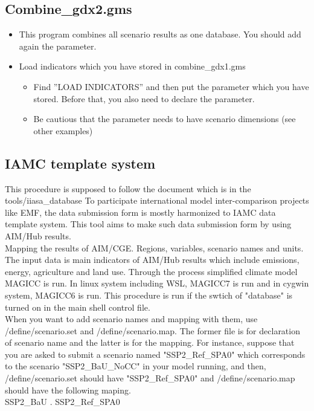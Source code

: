 \documentclass[10pt,a4paper,titlepage,dvipdfmx]{book}
\begin{document}
\subsection{\label{subsec:Combine2}Combine\_gdx2.gms}


\begin{itemize}
\item This program combines all scenario results as one database. You should add again the parameter.
\item Load indicators which you have stored in combine\_gdx1.gms
\begin{itemize}
\item Find ''LOAD INDICATORS'' and then put the parameter which you have stored. Before that, you also need to declare the parameter.
\item Be cautious that the parameter needs to have scenario dimensions (see other examples)
\end{itemize}

\end{itemize}
\subsection{\label{subsec:IAMCTemSts}IAMC template system }

  This procedure is supposed to follow the document which is in the tools/iiasa\_database
To participate international model inter-comparison projects like EMF, 
the data submission form is mostly harmonized to IAMC data template system. 
This tool aims to make such data submission form by using AIM/Hub results.
\\
  Mapping the results of AIM/CGE. Regions, variables, scenario names and units. 
The input data is main indicators of AIM/Hub results which include emissions, energy, agriculture and land use. 
Through the process simplified climate model MAGICC is run. In linux system including WSL, MAGICC7 is run and in cygwin system, MAGICC6 is run.
This procedure is run if the swtich of "database" is turned on in the main shell control file.
\\
  When you want to add scenario names and mapping with them, use /define/scenario.set and /define/scenario.map. 
The former file is for declaration of scenario name and the latter is for the mapping. 
For instance, suppose that you are asked to submit a scenario named "SSP2\_Ref\_SPA0" which corresponds to the scenario "SSP2\_BaU\_NoCC" in your model running, and
then, /define/scenario.set should have "SSP2\_Ref\_SPA0" and /define/scenario.map should have the following maping.
\\
SSP2\_BaU . SSP2\_Ref\_SPA0
\\
\end{document}
